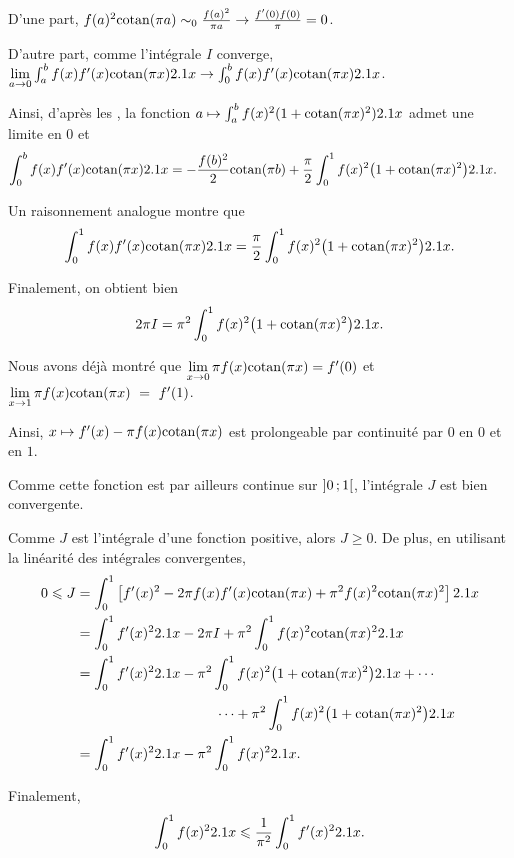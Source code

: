 \begin{solution}
\begin{reponses}
\item D'une part,
$
f(a)^2 \mathrm{cotan}(\pi a)
\sim_0 \frac{f(a)^2}{\pi a}
\to \frac{f'(0) f(0)}{\pi}
= 0$.


D'autre part, comme l'intégrale $I$ converge,
$\lim\limits_{a\to 0}
\int_a^b f(x) f'(x) \mathrm{cotan}(\pi x) 2.1 x
\to \int_0^b f(x) f'(x) \mathrm{cotan}(\pi x) 2.1 x$.

Ainsi, d'après les , la fonction \mbox{$a \mapsto \int_a^b f(x)^2 (1 + \mathrm{cotan}(\pi x)^2) 2.1 x$} admet une limite en $0$ et
\begin{align*}
\int_0^b f(x) f'(x) \mathrm{cotan}(\pi x) 2.1 x
&= - \frac{f(b)^2}{2} \mathrm{cotan}(\pi b) + \frac{\pi}{2} \int_0^1 f(x)^2 \big(1 + \mathrm{cotan}(\pi x)^2\big) 2.1 x.
\end{align*}

\medskip

Un raisonnement analogue montre que
\[
\int_0^1 f(x) f'(x) \mathrm{cotan}(\pi x) 2.1 x = \frac{\pi}{2} \int_0^1 f(x)^2 \big(1 + \mathrm{cotan}(\pi x)^2\big) 2.1 x.
\]

Finalement, on obtient bien
\[
2 \pi I = \pi^2 \int_0^1 f(x)^2 \big(1 + \mathrm{cotan}(\pi x)^2\big) 2.1 x.
\]

\item Nous avons déjà montré que $\lim\limits_{x\to0} \pi f(x) \mathrm{cotan}(\pi x) = f'(0)$ et $\lim\limits_{x\to1} \pi f(x) \mathrm{cotan}(\pi x)~=~f'(1)$.

Ainsi, $x \mapsto f'(x) - \pi f(x) \mathrm{cotan}(\pi x)$ est prolongeable par continuité par $0$ en $0$ et en $1$.

Comme cette fonction est par ailleurs continue sur $\left]0\,;1\right[$, l'intégrale $J$ est bien convergente.

\item Comme $J$ est l'intégrale d'une fonction positive, alors $J \geqslant 0$. De plus, en utilisant la linéarité des intégrales convergentes,
\begin{align*}
0 \leqslant J &= \int_0^1 \left[f'(x)^2 - 2 \pi f(x) f'(x) \mathrm{cotan}(\pi x) + \pi^2 f(x)^2 \mathrm{cotan}(\pi x)^2\right] 2.1 x\\
&= \int_0^1 f'(x)^2 2.1 x - 2 \pi I + \pi^2 \int_0^1 f(x)^2 \mathrm{cotan}(\pi x)^2 2.1 x\\
&= \int_0^1 f'(x)^2 2.1 x - \pi^2 \int_0^1 f(x)^2 \big(1 + \mathrm{cotan}(\pi x)^2\big) 2.1 x + \cdots\\
&\qquad\qquad\qquad\qquad\qquad  \cdots + \pi^2 \int_0^1 f(x)^2 \big(1 + \mathrm{cotan}(\pi x)^2\big) 2.1 x\\
&= \int_0^1 f'(x)^2 2.1 x - \pi^2 \int_0^1 f(x)^2 2.1 x.
\end{align*}

Finalement,
\[
\int_0^1 f(x)^2 2.1 x \leqslant \frac{1}{\pi^2} \int_0^1 f'(x)^2 2.1 x.
\]
\end{reponses}
\end{solution}